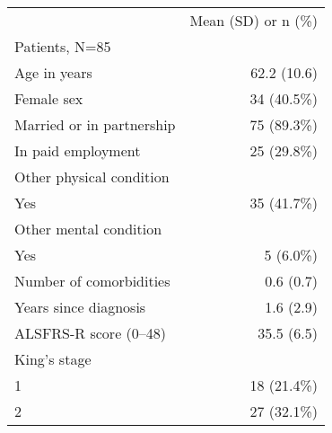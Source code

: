 \begin{table}[!h]
\centering
\begin{tabular}{ll}
\cline{1-2}
\multicolumn{1}{r}{} &
  \multicolumn{1}{c}{Mean (SD) or n (\%)} \\
\cline{1-2}
\multicolumn{1}{l}{Patients, N=85} &
  \multicolumn{1}{r}{} \\
\multicolumn{1}{l}{\hspace{1em}Age in years} &
  \multicolumn{1}{r}{62.2 (10.6)} \\
\multicolumn{1}{l}{\hspace{1em}Female sex} &
  \multicolumn{1}{r}{34 (40.5\%)} \\
\multicolumn{1}{l}{\hspace{1em}Married or in partnership} &
  \multicolumn{1}{r}{75 (89.3\%)} \\
\multicolumn{1}{l}{\hspace{1em}In paid employment} &
  \multicolumn{1}{r}{25 (29.8\%)} \\
\multicolumn{1}{l}{\hspace{1em}Other physical condition} &
  \multicolumn{1}{r}{} \\
\multicolumn{1}{l}{\hspace{2em}Yes} &
  \multicolumn{1}{r}{35 (41.7\%)} \\
\multicolumn{1}{l}{\hspace{1em}Other mental condition} &
  \multicolumn{1}{r}{} \\
\multicolumn{1}{l}{\hspace{2em}Yes} &
  \multicolumn{1}{r}{5 (6.0\%)} \\
\multicolumn{1}{l}{\hspace{1em}Number of comorbidities} &
  \multicolumn{1}{r}{0.6 (0.7)} \\
\multicolumn{1}{l}{\hspace{1em}Years since diagnosis} &
  \multicolumn{1}{r}{1.6 (2.9)} \\
\multicolumn{1}{l}{\hspace{1em}ALSFRS-R score (0–48)} &
  \multicolumn{1}{r}{35.5 (6.5)} \\
\multicolumn{1}{l}{\hspace{1em}King's stage} &
  \multicolumn{1}{r}{} \\
\multicolumn{1}{l}{\hspace{2em}1} &
  \multicolumn{1}{r}{18 (21.4\%)} \\
\multicolumn{1}{l}{\hspace{2em}2} &
  \multicolumn{1}{r}{27 (32.1\%)} \\

\end{tabular}
\end{table}
